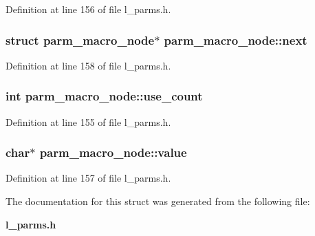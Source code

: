 Definition at line 156 of file l\_\-parms.h.
\subsubsection{\setlength{\rightskip}{0pt plus 5cm}struct \bf{parm\_\-macro\_\-node}$\ast$ \bf{parm\_\-macro\_\-node::next}}\label{structparm__macro__node_40505d5a82949c29a26a8a6423d62311}




Definition at line 158 of file l\_\-parms.h.
\subsubsection{\setlength{\rightskip}{0pt plus 5cm}int \bf{parm\_\-macro\_\-node::use\_\-count}}\label{structparm__macro__node_52ee90b7e9963c3a615e6c0386e4e2d3}




Definition at line 155 of file l\_\-parms.h.
\subsubsection{\setlength{\rightskip}{0pt plus 5cm}char$\ast$ \bf{parm\_\-macro\_\-node::value}}\label{structparm__macro__node_fff9a4ef18087c4aaf038d496d590180}




Definition at line 157 of file l\_\-parms.h.

The documentation for this struct was generated from the following file:\begin{CompactItemize}
\item 
\bf{l\_\-parms.h}\end{CompactItemize}
